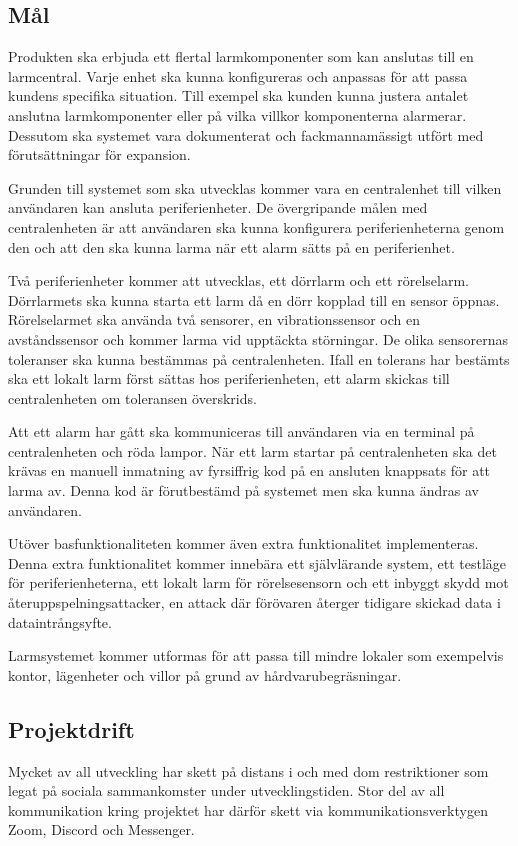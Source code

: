\documentclass[a4paper]{article}
\begin{document}
\subsection{Mål}

Produkten ska erbjuda ett flertal larmkomponenter som kan anslutas till en larmcentral.
Varje enhet ska kunna konfigureras och anpassas för att passa kundens specifika situation.
Till exempel ska kunden kunna justera antalet anslutna larmkomponenter eller på vilka villkor komponenterna alarmerar.
Dessutom ska systemet vara dokumenterat och fackmannamässigt utfört med förutsättningar för expansion.

Grunden till systemet som ska utvecklas kommer vara en centralenhet till vilken användaren kan ansluta periferienheter. De övergripande målen med centralenheten är att användaren ska kunna konfigurera periferienheterna genom den och att den ska kunna larma när ett alarm sätts på en periferienhet.

Två periferienheter kommer att utvecklas, ett dörrlarm och ett rörelselarm.
Dörrlarmets ska kunna starta ett larm då en dörr kopplad till en sensor öppnas.
Rörelselarmet ska använda två sensorer, en vibrationssensor och en avståndssensor och kommer larma vid upptäckta störningar.
De olika sensorernas toleranser ska kunna bestämmas på centralenheten.
Ifall en tolerans har bestämts ska ett lokalt larm först sättas hos periferienheten, ett alarm skickas till centralenheten om toleransen överskrids.

Att ett alarm har gått ska kommuniceras till användaren via en terminal på centralenheten och röda lampor.
När ett larm startar på centralenheten ska det krävas en manuell inmatning av fyrsiffrig kod på en ansluten knappsats för att larma av.
Denna kod är förutbestämd på systemet men ska kunna ändras av användaren.

Utöver basfunktionaliteten kommer även extra funktionalitet implementeras.
Denna extra funktionalitet kommer innebära ett självlärande system, ett testläge för periferienheterna, ett lokalt larm för rörelsesensorn och ett inbyggt skydd mot återuppspelningsattacker, en attack där förövaren återger tidigare skickad data i dataintrångsyfte.

Larmsystemet kommer utformas för att passa till mindre lokaler som exempelvis kontor, lägenheter och villor på grund av hårdvarubegräsningar.

\subsection{Projektdrift}
Mycket av all utveckling har skett på distans i och med dom restriktioner som legat på sociala sammankomster under utvecklingstiden.
Stor del av all kommunikation kring projektet har därför skett via kommunikationsverktygen Zoom, Discord och Messenger.
\end{document}
